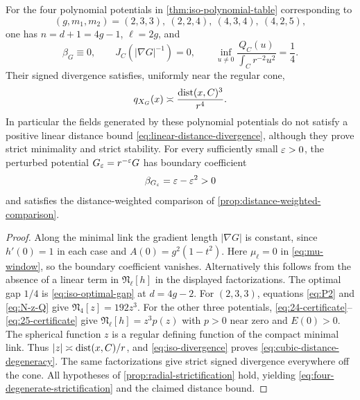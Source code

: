\begin{corollary}
\label{cor:four-degenerate-certificates}
For the four polynomial potentials in \cref{thm:iso-polynomial-table}
corresponding to
\begin{equation}\label{eq:four-degenerate-list}
 (g,m_1,m_2)=(2,3,3),\ (2,2,4),\ (4,3,4),\ (4,2,5),
\end{equation}
one has \(n=d+1=4g-1\), \(\ell=2g\), and
\begin{equation}\label{eq:degenerate-trace-gap}
 \beta_G\equiv0,\qquad J_C(|\nabla G|^{-1})=0,\qquad
 \inf_{u\neq0}\frac{Q_C(u)}{\int_Cr^{-2}u^2}=\frac14.
\end{equation}
Their signed divergence satisfies, uniformly near the regular cone,
\begin{equation}\label{eq:cubic-distance-degeneracy}
 q_{X_G}(x)\asymp\frac{\operatorname{dist}(x,C)^3}{r^4}.
\end{equation}
In particular the fields generated by these polynomial potentials do not satisfy a positive
linear distance bound \eqref{eq:linear-distance-divergence}, although they
prove strict minimality and strict stability.
For every sufficiently small \(\varepsilon>0\), the perturbed potential
\(G_\varepsilon=r^{-\varepsilon}G\) has boundary coefficient
\begin{equation}\label{eq:four-degenerate-strictification}
 \beta_{G_\varepsilon}=\varepsilon-\varepsilon^2>0
\end{equation}
and satisfies the distance-weighted comparison of
\cref{prop:distance-weighted-comparison}.
\end{corollary}

\begin{proof}
Along the minimal link the gradient length \(|\nabla G|\) is constant,
since \(h'(0)=1\) in each case and \(A(0)=g^2(1-t^2)\).
Here \(\mu_\ell=0\) in \eqref{eq:mu-window}, so the boundary coefficient
vanishes.  Alternatively this follows from the absence of a linear term in
\(\mathfrak N_\ell[h]\) in the displayed factorizations.
The optimal gap \(1/4\) is \eqref{eq:iso-optimal-gap} at
\(d=4g-2\).
For \((2,3,3)\), equations \eqref{eq:P2} and \eqref{eq:N-z-Q} give
\(\mathfrak N_4[z]=192z^3\).  For the other three potentials,
\eqref{eq:24-certificate}--\eqref{eq:25-certificate} give
\(\mathfrak N_\ell[h]=z^3p(z)\) with \(p>0\) near zero and
\(E(0)>0\).  The spherical function \(z\) is a regular defining
function of the compact minimal link.  Thus \(|z|\asymp\operatorname{dist}(x,C)/r\),
and \eqref{eq:iso-divergence} proves
\eqref{eq:cubic-distance-degeneracy}.
The same factorizations give strict signed divergence everywhere off the
cone.  All hypotheses of \cref{prop:radial-strictification} hold, yielding
\eqref{eq:four-degenerate-strictification} and the claimed distance bound.
\end{proof}

